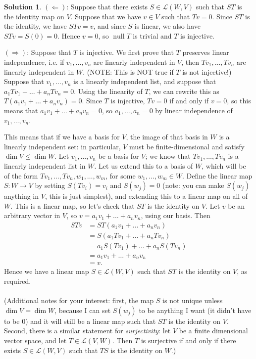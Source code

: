 \documentclass[12pt]{article}
\theoremstyle{definition}
\theoremstyle{definition}
\newtheorem*{soln}{Solution}
\newcommand{\Null}{\operatorname{null}}
\begin{document}
\begin{soln}
$(\Leftarrow)$: Suppose that there exists $S\in \mathcal{L}(W,V)$ such that $ST$ is the identity map on $V$. Suppose that we have $v\in V$ such that $Tv=0$. Since $ST$ is the identity, we have $STv=v$, and since $S$ is linear, we also have $STv=S(0)=0$. Hence $v=0$, so $\Null T$ is trivial and $T$ is injective.

$(\Rightarrow)$: Suppose that $T$ is injective. We first prove that $T$ preserves linear independence, i.e. if $v_1,\dots,v_n$ are linearly independent in $V$, then $Tv_1,\dots,Tv_n$ are linearly independent in $W$. (NOTE: This is NOT true if $T$ is not injective!) Suppose that $v_1,\dots,v_n$ is a linearly independent list, and suppose that $a_1Tv_1+\dots+a_nTv_n=0$. Using the linearity of $T$, we can rewrite this as $T(a_1v_1+\dots+a_nv_n)=0$. Since $T$ is injective, $Tv=0$ if and only if $v=0$, so this means that $a_1v_1+\dots+a_nv_n=0$, so $a_1,\dots,a_n=0$ by linear independence of $v_1,\dots,v_n$.

This means that if we have a basis for $V$, the image of that basis in $W$ is a linearly independent set: in particular, $V$ must be finite-dimensional and satisfy $\dim V\leq \dim W$. Let $v_1,\dots,v_n$ be a basis for $V$; we know that $Tv_1,\dots,Tv_n$ is a linearly independent list in $W$. Let us extend this to a basis of $W$, which will be of the form $Tv_1,\dots,Tv_n,w_1,\dots,w_m$, for some $w_1,\dots,w_m\in W$. Define the linear map $S:W\to V$ by setting $S(Tv_i)=v_i$ and $S(w_j)=0$ (note: you can make $S(w_j)$ anything in $V$, this is just simplest), and extending this to a linear map on all of $W$. This is a linear map, so let's check that $ST$ is the identity on $V$. Let $v$ be an arbitrary vector in $V$, so $v=a_1v_1+\dots+a_nv_n$, using our basis. Then
\begin{align*}
STv &= ST(a_1v_1+\dots+a_nv_n)\\
&= S(a_1Tv_1+\dots+a_nTv_n) \tag{using linearity of $T$}\\
&= a_1S(Tv_1)+\dots+a_nS(Tv_n) \tag{using linearity of $S$}\\
&= a_1v_1+\dots+a_nv_n \tag{using definition of $S$ on basis elements}\\
&= v.
\end{align*}
Hence we have a linear map $S\in\mathcal{L}(W,V)$ such that $ST$ is the identity on $V$, as required.
\\~\\
{\small (Additional notes for your interest: first, the map $S$ is not unique unless $\dim V=\dim W$, because I can set $S(w_j)$ to be anything I want (it didn't have to be $0$) and it will still be a linear map such that $ST$ is the identity on $V$. Second, there is a similar statement for \emph{surjectivity}: let $V$ be a finite dimensional vector space, and let $T\in\mathcal{L}(V,W)$. Then $T$ is surjective if and only if there exists $S\in \mathcal{L}(W,V)$ such that $TS$ is the identity on $W$.)}
\end{soln}
\end{document}
